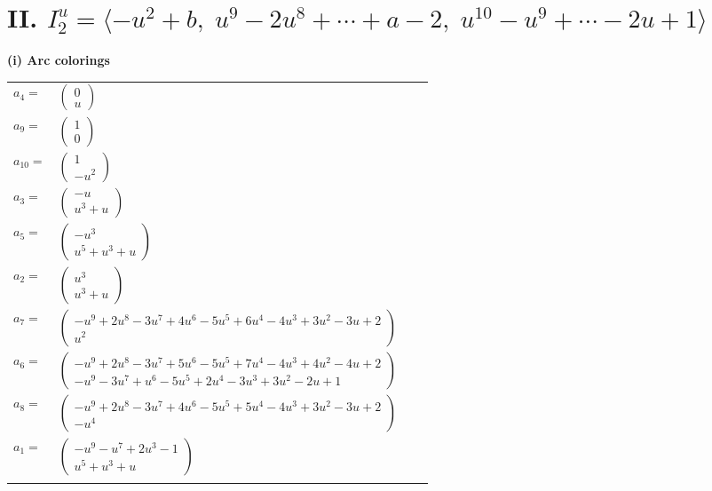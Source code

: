 \documentclass[1p]{elsarticle_modified}
\theoremstyle{definition}
\begin{document}
\centering \section*{II. $I^u_{2}= \langle - u^2+b,\;u^9-2 u^8+\cdots+a-2,\;u^{10}- u^9+\cdots-2 u+1 \rangle$}
\flushleft \textbf{(i) Arc colorings}\\
\begin{tabular}{m{7pt} m{180pt} m{7pt} m{180pt} }
\flushright $a_{4}=$&$\begin{pmatrix}0\\u\end{pmatrix}$ \\
\flushright $a_{9}=$&$\begin{pmatrix}1\\0\end{pmatrix}$ \\
\flushright $a_{10}=$&$\begin{pmatrix}1\\- u^2\end{pmatrix}$ \\
\flushright $a_{3}=$&$\begin{pmatrix}- u\\u^3+u\end{pmatrix}$ \\
\flushright $a_{5}=$&$\begin{pmatrix}- u^3\\u^5+u^3+u\end{pmatrix}$ \\
\flushright $a_{2}=$&$\begin{pmatrix}u^3\\u^3+u\end{pmatrix}$ \\
\flushright $a_{7}=$&$\begin{pmatrix}- u^9+2 u^8-3 u^7+4 u^6-5 u^5+6 u^4-4 u^3+3 u^2-3 u+2\\u^2\end{pmatrix}$ \\
\flushright $a_{6}=$&$\begin{pmatrix}- u^9+2 u^8-3 u^7+5 u^6-5 u^5+7 u^4-4 u^3+4 u^2-4 u+2\\- u^9-3 u^7+u^6-5 u^5+2 u^4-3 u^3+3 u^2-2 u+1\end{pmatrix}$ \\
\flushright $a_{8}=$&$\begin{pmatrix}- u^9+2 u^8-3 u^7+4 u^6-5 u^5+5 u^4-4 u^3+3 u^2-3 u+2\\- u^4\end{pmatrix}$ \\
\flushright $a_{1}=$&$\begin{pmatrix}- u^9- u^7+2 u^3-1\\u^5+u^3+u\end{pmatrix}$\\&\end{tabular}
\end{document}
